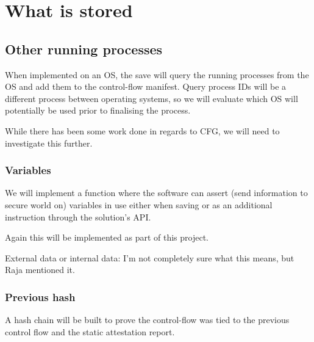 \section{What is stored}

\subsection{Other running processes}

When implemented on an OS, the save will query the running processes from the OS and add them to the control-flow manifest. Query process IDs will be a different process between operating systems, so we will evaluate which OS will potentially be used prior to finalising the process.

While there has been some work done in regards to CFG, we will need to investigate this further.

\subsubsection{Variables}

We will implement a function where the software can assert (send information to secure world on) variables in use either when saving or as an additional instruction through the solution's API.

Again this will be implemented as part of this project.

External data or internal data: I'm not completely sure what this means, but Raja mentioned it.

\subsubsection{Previous hash}

A hash chain will be built to prove the control-flow was tied to the previous control flow and the static attestation report.